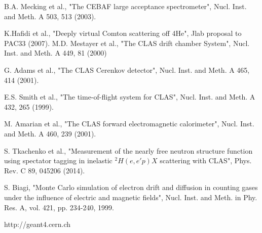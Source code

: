 \documentclass[reprint, amsmath,amssymb, aps]{revtex4-1}
\begin{document}
\begin{thebibliography}{}
B.A. Mecking et al., "The CEBAF large acceptance spectrometer", Nucl. Inst. and Meth. A 503, 513 (2003).

K.Hafidi et al., "Deeply virtual Comton scattering off 4He", Jlab proposal to PAC33 (2007).
M.D. Mestayer et al., "The CLAS drift chamber System", Nucl. Inst. and Meth. A 449, 81 (2000)

G. Adams et al., "The CLAS Cerenkov detector", Nucl. Inst. and Meth. A 465, 414 (2001).

E.S. Smith et al., "The time-of-flight system for CLAS", Nucl. Inst. and Meth. A 432, 265 (1999).

M. Amarian et al., "The CLAS forward electromagnetic calorimeter", Nucl. Inst. and Meth. A 460, 239 (2001). 

S. Tkachenko et al., "Measurement of the nearly free neutron structure function using spectator tagging in inelastic $^{2}H(e,e'p)X$ scattering with CLAS",	Phys. Rev. C 89, 045206 (2014).

S. Biagi, "Monte Carlo simulation of electron drift and diffusion in counting gases under the influence of electric and magnetic fields", Nucl. Inst. and Meth. in Phy. Res. A, vol. 421, pp. 234-240, 1999.

http://geant4.cern.ch

\end{thebibliography}
\end{document}
